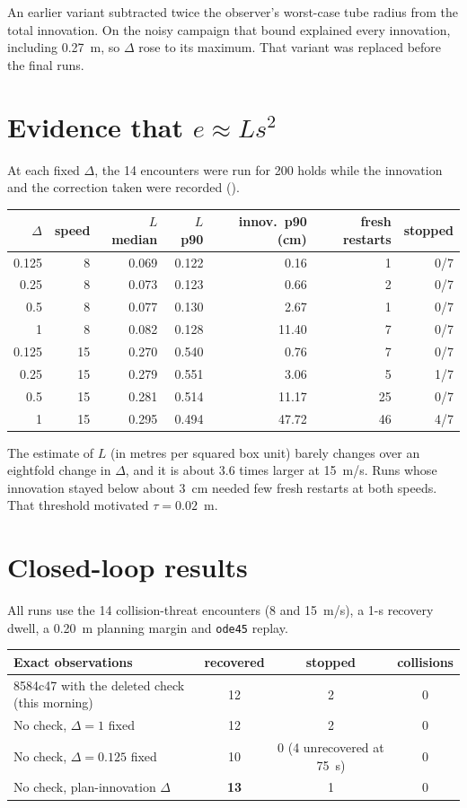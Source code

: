 \documentclass[11pt]{article}
\begin{document}
An earlier variant subtracted twice the observer's worst-case tube radius from
the total innovation. On the noisy campaign that bound explained every
innovation, including 0.27~m, so $\Delta$ rose to its maximum. That variant was
replaced before the final runs.

\section{Evidence that $e\approx Ls^2$}
At each fixed $\Delta$, the 14 encounters were run for 200 holds while the
innovation and the correction taken were recorded ().

\begin{center}
\begin{tabular}{rrrrrrr}
\toprule
$\Delta$ & speed & $L$ median & $L$ p90 & innov.\ p90 (cm) & fresh restarts & stopped \\
\midrule
0.125 & 8 & 0.069 & 0.122 & 0.16 & 1 & 0/7\\
0.25 & 8 & 0.073 & 0.123 & 0.66 & 2 & 0/7\\
0.5 & 8 & 0.077 & 0.130 & 2.67 & 1 & 0/7\\
1 & 8 & 0.082 & 0.128 & 11.40 & 7 & 0/7\\
0.125 & 15 & 0.270 & 0.540 & 0.76 & 7 & 0/7\\
0.25 & 15 & 0.279 & 0.551 & 3.06 & 5 & 1/7\\
0.5 & 15 & 0.281 & 0.514 & 11.17 & 25 & 0/7\\
1 & 15 & 0.295 & 0.494 & 47.72 & 46 & 4/7\\
\bottomrule
\end{tabular}
\end{center}

The estimate of $L$ (in metres per squared box unit) barely changes over an
eightfold change in $\Delta$, and it is about 3.6 times larger at 15~m/s. Runs
whose innovation stayed below about 3~cm needed few fresh restarts at both
speeds. That threshold motivated $\tau=0.02$~m.

\section{Closed-loop results}\label{sec:fixed}
All runs use the 14 collision-threat encounters (8 and 15~m/s), a 1-s recovery
dwell, a 0.20~m planning margin and \texttt{ode45} replay.

\begin{center}
\begin{tabular}{lccc}
\toprule
Exact observations & recovered & stopped & collisions\\
\midrule
8584c47 with the deleted check (this morning) & 12 & 2 & 0\\
No check, $\Delta=1$ fixed & 12 & 2 & 0\\
No check, $\Delta=0.125$ fixed & 10 & 0 (4 unrecovered at 75~s) & 0\\
No check, plan-innovation $\Delta$ & \textbf{13} & 1 & 0\\
\bottomrule
\end{tabular}
\end{center}
\end{document}
